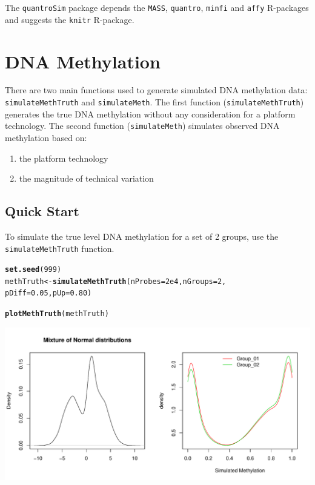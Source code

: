 \documentclass{article}\usepackage[]{graphicx}\usepackage[usenames,dvipsnames]{color}
\makeatletter
\def\maxwidth{ %
  \ifdim\Gin@nat@width>\linewidth
    \linewidth
  \else
    \Gin@nat@width
  \fi
}
\newcommand{\hlnum}[1]{\textcolor[rgb]{0.686,0.059,0.569}{#1}}%
\newcommand{\hlstd}[1]{\textcolor[rgb]{0.345,0.345,0.345}{#1}}%
\newcommand{\hlkwb}[1]{\textcolor[rgb]{0.69,0.353,0.396}{#1}}%
\newcommand{\hlkwc}[1]{\textcolor[rgb]{0.333,0.667,0.333}{#1}}%
\newcommand{\hlkwd}[1]{\textcolor[rgb]{0.737,0.353,0.396}{\textbf{#1}}}%
\newenvironment{kframe}{%
 \def\at@end@of@kframe{}%
 \ifinner\ifhmode%
  \def\at@end@of@kframe{\end{minipage}}%
  \begin{minipage}{\columnwidth}%
 \fi\fi%
 \def\FrameCommand##1{\hskip\@totalleftmargin \hskip-\fboxsep
 \colorbox{shadecolor}{##1}\hskip-\fboxsep
     \hskip-\linewidth \hskip-\@totalleftmargin \hskip\columnwidth}%
 \MakeFramed {\advance\hsize-\width
   \@totalleftmargin\z@ \linewidth\hsize
   \@setminipage}}%
 {\par\unskip\endMakeFramed%
 \at@end@of@kframe}
\newenvironment{knitrout}{}{} %
\makeatother
\begin{document}
The \texttt{quantroSim} package depends the \texttt{MASS}, \texttt{quantro}, 
\texttt{minfi} and \texttt{affy} R-packages and suggests the 
\texttt{knitr} R-package.  


\section{DNA Methylation}
There are two main functions used to generate simulated DNA methylation data: 
\texttt{simulateMethTruth} and \texttt{simulateMeth}. The first function 
(\texttt{simulateMethTruth}) generates the true DNA methylation without any 
consideration for a platform technology. The second function 
(\texttt{simulateMeth}) simulates observed DNA methylation based on: 

\begin{enumerate}
\item the platform technology 
\item the magnitude of technical variation
\end{enumerate}

\subsection{Quick Start}
To simulate the true level DNA methylation for a set of 2 groups, use the 
\texttt{simulateMethTruth} function. 
\begin{knitrout}
\color{fgcolor}\begin{kframe}
\begin{alltt}
\hlkwd{set.seed}\hlstd{(}\hlnum{999}\hlstd{)}
\hlstd{methTruth} \hlkwb{<-} \hlkwd{simulateMethTruth}\hlstd{(}\hlkwc{nProbes} \hlstd{=} \hlnum{2e4}\hlstd{,} \hlkwc{nGroups} \hlstd{=} \hlnum{2}\hlstd{,}
                               \hlkwc{pDiff} \hlstd{=} \hlnum{0.05}\hlstd{,} \hlkwc{pUp} \hlstd{=} \hlnum{0.80}\hlstd{)}
\end{alltt}


{\ttfamily\noindent\itshape\color{messagecolor}{\#\# [quantroSim]: Simulating a mixture of 3 Normal distributions \\\#\#\ \ \ \ \ \ \ \ \ \ \ \  with mean (-3, 1, 3) and standard deviation (3, 0.4, 3)}}\begin{alltt}
\hlkwd{plotMethTruth}\hlstd{(methTruth)}
\end{alltt}
\end{kframe}
\includegraphics[width=\maxwidth]{figure/methTruth-Fig-1} 

\end{knitrout}
\end{document}
